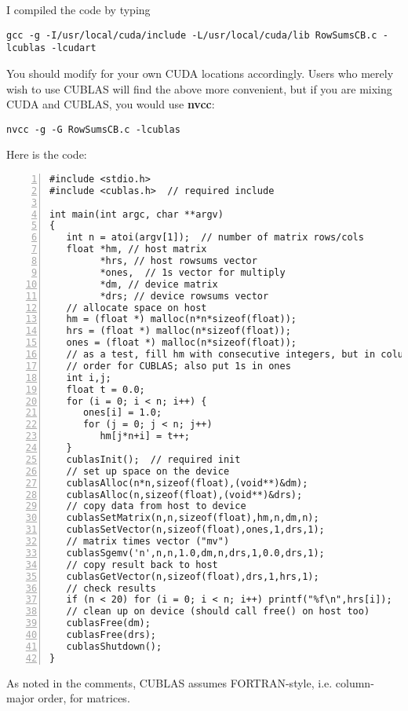 I compiled the code by typing

\begin{Verbatim}[fontsize=\relsize{-2}]
gcc -g -I/usr/local/cuda/include -L/usr/local/cuda/lib RowSumsCB.c -lcublas -lcudart
\end{Verbatim}

You should modify for your own CUDA locations accordingly.  Users who
merely wish to use CUBLAS will find the above more convenient, but if
you are mixing CUDA and CUBLAS, you would use {\bf nvcc}:

\begin{Verbatim}[fontsize=\relsize{-2}]
nvcc -g -G RowSumsCB.c -lcublas 
\end{Verbatim}

Here is the code:

\begin{lstlisting}[numbers=left]
#include <stdio.h>
#include <cublas.h>  // required include

int main(int argc, char **argv)
{
   int n = atoi(argv[1]);  // number of matrix rows/cols
   float *hm, // host matrix
         *hrs, // host rowsums vector
         *ones,  // 1s vector for multiply
         *dm, // device matrix
         *drs; // device rowsums vector
   // allocate space on host 
   hm = (float *) malloc(n*n*sizeof(float));
   hrs = (float *) malloc(n*sizeof(float));
   ones = (float *) malloc(n*sizeof(float));
   // as a test, fill hm with consecutive integers, but in column-major
   // order for CUBLAS; also put 1s in ones
   int i,j;
   float t = 0.0;
   for (i = 0; i < n; i++) {
      ones[i] = 1.0;
      for (j = 0; j < n; j++) 
         hm[j*n+i] = t++;
   }
   cublasInit();  // required init
   // set up space on the device
   cublasAlloc(n*n,sizeof(float),(void**)&dm);
   cublasAlloc(n,sizeof(float),(void**)&drs);
   // copy data from host to device
   cublasSetMatrix(n,n,sizeof(float),hm,n,dm,n);
   cublasSetVector(n,sizeof(float),ones,1,drs,1);
   // matrix times vector ("mv")
   cublasSgemv('n',n,n,1.0,dm,n,drs,1,0.0,drs,1);
   // copy result back to host
   cublasGetVector(n,sizeof(float),drs,1,hrs,1);
   // check results
   if (n < 20) for (i = 0; i < n; i++) printf("%f\n",hrs[i]);
   // clean up on device (should call free() on host too)
   cublasFree(dm);
   cublasFree(drs);
   cublasShutdown();
}
\end{lstlisting}

As noted in the comments, CUBLAS assumes FORTRAN-style, i.e.
column-major order, for matrices.

